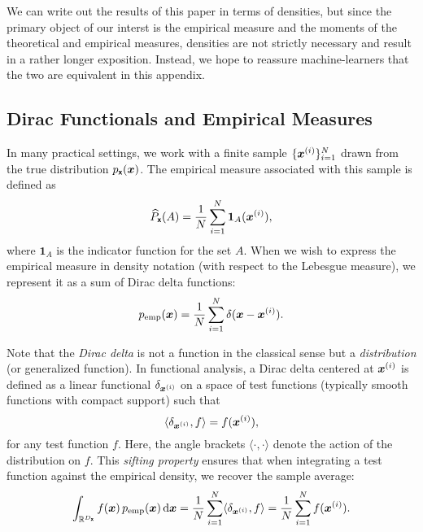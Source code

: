 \documentclass[wcp]{jmlr} %
\begin{document}
We can write out the results of this paper in terms of densities, but since the primary object of our interst is the empirical measure and the moments of the theoretical and empirical measures, densities are not strictly necessary and result in a rather longer exposition.
Instead, we hope to reassure machine-learners that the two are equivalent in this appendix.

\subsection*{Dirac Functionals and Empirical Measures}

In many practical settings, we work with a finite sample \(\{\boldsymbol{x}^{(i)}\}_{i=1}^N\) drawn from the true distribution \(p_{\boldsymbol{\mathsf{x}}}(\boldsymbol{x})\). The empirical measure associated with this sample is defined as
\begin{equation}
    \widehat{P}_{\boldsymbol{\mathsf{x}}}(A) = \frac{1}{N} \sum_{i=1}^N \mathbf{1}_A(\boldsymbol{x}^{(i)}),
\end{equation}
where \(\mathbf{1}_A\) is the indicator function for the set \(A\). When we wish to express the empirical measure in density notation (with respect to the Lebesgue measure), we represent it as a sum of Dirac delta functions:
\begin{equation}
    p_{\text{emp}}(\boldsymbol{x}) = \frac{1}{N} \sum_{i=1}^N \delta(\boldsymbol{x}-\boldsymbol{x}^{(i)}).
\end{equation}

Note that the \emph{Dirac delta} is not a function in the classical sense but a \emph{distribution} (or generalized function). In functional analysis, a Dirac delta centered at \(\boldsymbol{x}^{(i)}\) is defined as a linear functional \(\delta_{\boldsymbol{x}^{(i)}}\) on a space of test functions (typically smooth functions with compact support) such that
\begin{equation}
    \langle \delta_{\boldsymbol{x}^{(i)}}, f \rangle = f(\boldsymbol{x}^{(i)}),
\end{equation}
for any test function \(f\). Here, the angle brackets \(\langle \cdot,\cdot \rangle\) denote the action of the distribution on \(f\). This \emph{sifting property} ensures that when integrating a test function against the empirical density, we recover the sample average:
\begin{equation}
    \int_{\mathbb{R}^{D_{\boldsymbol{\mathsf{x}}}}} f(\boldsymbol{x})\,p_{\text{emp}}(\boldsymbol{x})\,\mathrm{d}\boldsymbol{x}
    = \frac{1}{N} \sum_{i=1}^N \langle \delta_{\boldsymbol{x}^{(i)}}, f \rangle
    = \frac{1}{N} \sum_{i=1}^N f(\boldsymbol{x}^{(i)}).
\end{equation}
\end{document}

